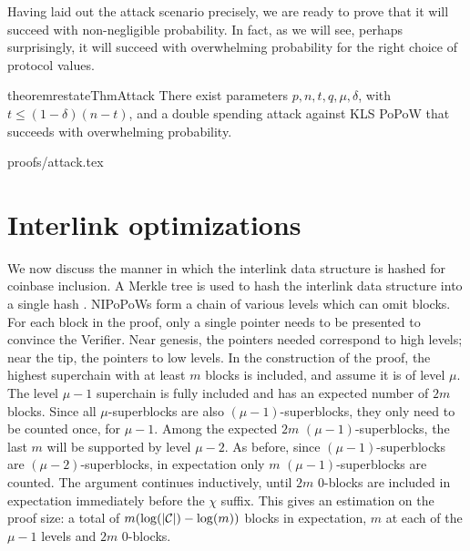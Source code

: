 Having laid out the attack scenario precisely, we are ready to prove that it
will succeed with non-negligible probability. In fact, as we will see, perhaps
surprisingly, it will succeed with overwhelming probability for the right choice
of protocol values.

\begin{restatable}{theorem}{restateThmAttack}
There exist parameters $p, n, t, q,  \mu, \delta$, with $t\leq (1-\delta)(n-t)$,
and a double spending attack against KLS PoPoW that succeeds with overwhelming
probability.
\end{restatable}
\ifonecolumn
{proofs/attack.tex}
\fi

\section{Interlink optimizations}
We now discuss the manner in which the interlink data structure is hashed for
coinbase inclusion. A Merkle tree is used to hash the interlink data structure
into a single hash \cite{KLS}. NIPoPoWs form a chain of various levels
which can omit blocks. For each block in the proof,
only a single pointer needs to be presented to convince the Verifier. Near
genesis, the pointers needed correspond to high levels; near
the tip, the pointers to low levels. In the construction of
the proof, the highest superchain with at least $m$ blocks is included, and
assume it is of level $\mu$. The level $\mu - 1$ superchain is fully
included and has an expected number of $2m$ blocks. Since all
$\mu$-superblocks are also $(\mu - 1)$-superblocks, they only need to be
counted once, for $\mu - 1$. Among the expected $2m$ $(\mu - 1)$-superblocks,
the last $m$ will be supported by level $\mu - 2$. As before, since $(\mu -
1)$-superblocks are $(\mu - 2)$-superblocks, in expectation only $m$
$(\mu-1)$-superblocks are counted. The argument continues inductively, until
$2m$ $0$-blocks are included in expectation immediately before the $\chi$
suffix. This gives an estimation on the proof size: a total of $m
(\log(|\mathcal{C}|) - \log(m))$ blocks in expectation, $m$ at each of the $\mu - 1$
levels and $2m$ $0$-blocks.

